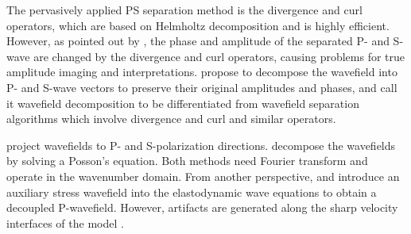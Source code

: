 \documentclass[manuscript,ulem,graphix,revised]{geophysics}
\begin{document}
The pervasively applied PS separation method is the divergence and curl operators, which are based on Helmholtz decomposition \citep{aki80} and is highly efficient. However, as pointed out by \citet{sun01}, the phase and amplitude of the separated P- and S-wave are changed by the divergence and curl operators, causing problems for true amplitude imaging and interpretations.
\citet{zhang10} propose to decompose the wavefield into P- and S-wave vectors to preserve their original amplitudes and phases, and call it wavefield decomposition to be differentiated from wavefield separation algorithms which involve divergence and curl and similar operators. 

\citet{zhang10} project wavefields to P- and S-polarization directions. \citet{zhu17} decompose the wavefields by solving a Posson's equation. Both methods need Fourier transform and operate in the wavenumber domain. From another perspective, \citet{ma03} and \citet{wenlong_vct15} introduce an auxiliary stress wavefield into the elastodynamic wave equations \citep{virieux84} to obtain a decoupled P-wavefield. However, artifacts are generated along the sharp velocity interfaces of the model \citep{wenlong_cmp15}. 


\end{document}

